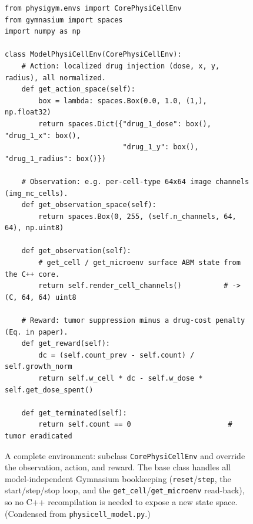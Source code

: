 \begin{figure}[t]
\begin{lstlisting}
from physigym.envs import CorePhysiCellEnv
from gymnasium import spaces
import numpy as np

class ModelPhysiCellEnv(CorePhysiCellEnv):
    # Action: localized drug injection (dose, x, y, radius), all normalized.
    def get_action_space(self):
        box = lambda: spaces.Box(0.0, 1.0, (1,), np.float32)
        return spaces.Dict({"drug_1_dose": box(), "drug_1_x": box(),
                            "drug_1_y": box(), "drug_1_radius": box()})

    # Observation: e.g. per-cell-type 64x64 image channels (img_mc_cells).
    def get_observation_space(self):
        return spaces.Box(0, 255, (self.n_channels, 64, 64), np.uint8)

    def get_observation(self):
        # get_cell / get_microenv surface ABM state from the C++ core.
        return self.render_cell_channels()          # -> (C, 64, 64) uint8

    # Reward: tumor suppression minus a drug-cost penalty (Eq. in paper).
    def get_reward(self):
        dc = (self.count_prev - self.count) / self.growth_norm
        return self.w_cell * dc - self.w_dose * self.get_dose_spent()

    def get_terminated(self):
        return self.count == 0                       # tumor eradicated
\end{lstlisting}
\caption{A complete \physigym{} environment: subclass \texttt{CorePhysiCellEnv} and
  override the observation, action, and reward. The base class handles all
  model-independent Gymnasium bookkeeping (\texttt{reset}/\texttt{step}, the
  \physicell{} start/step/stop loop, and the \texttt{get\_cell}/\texttt{get\_microenv}
  read-back), so no C++ recompilation is needed to expose a new state space.
  (Condensed from \texttt{physicell\_model.py}.)}
\label{lst:env}
\end{figure}
